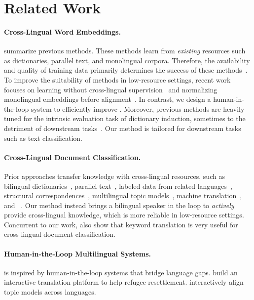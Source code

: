 \section{Related Work}
\label{sec:related}


\paragraph{Cross-Lingual Word Embeddings.}
\citet{ruder-19} summarize previous  methods.
These methods learn from \emph{existing} resources such as dictionaries,
parallel text, and monolingual corpora.
Therefore, the availability
and quality of training data primarily determines
the success of these methods~\citep{sogaard-18}. To improve the suitability of  methods in low-resource settings,
recent work focuses on learning without cross-lingual
supervision~\citep{artetxe-18b,hoshen-18}
and normalizing monolingual embeddings before alignment~\citep{zhang-19}.
In contrast, we design a human-in-the-loop system to efficiently improve
.
Moreover, previous  methods are heavily tuned for the intrinsic
evaluation task of dictionary induction, sometimes to the detriment of
downstream tasks~\citep{glavas-19,zhang-20b}.
Our method is tailored for downstream tasks such as text classification.

\paragraph{Cross-Lingual Document Classification.}
Prior approaches transfer knowledge with cross-lingual resources, such as
bilingual dictionaries~\citep{wu-08,shi-10}, parallel text~\citep{xu-17}, labeled data
from related languages~\citep{zhang-20}, structural
correspondences~\citep{prettenhofer-2010}, multilingual topic
models~\citep{ni-2011,andrade-15}, machine translation~\citep{wan-09-fixed,zhou-16}, and
~\citep{klementiev-12}.
Our method instead brings a bilingual speaker in the loop to \emph{actively}
provide cross-lingual knowledge, which is more reliable in low-resource
settings.
Concurrent to our work, \citet{karamanolakis-20} also show that keyword translation is very useful for cross-lingual document classification.

\paragraph{Human-in-the-Loop Multilingual Systems.}
\name{} is inspired by human-in-the-loop systems that bridge language gaps.
\citet{brown-2016} build an interactive translation platform to help refugee
resettlement.
\citet{yuan-18} interactively align topic models across languages.

